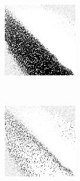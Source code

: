 
\begin{figure}
\center

	\begin{subfigure}[t]{0.22\textwidth}
		\includegraphics[width=\textwidth]{images/findings/experiments/randomization/strats/hand_max_min.png}
		\caption{\handmaxmin}
	\end{subfigure}
	~
	\begin{subfigure}[t]{0.22\textwidth}
		\includegraphics[width=\textwidth]{images/findings/experiments/randomization/strats/hand_max_avg.png}

\end{subfigure}
\end{figure}
